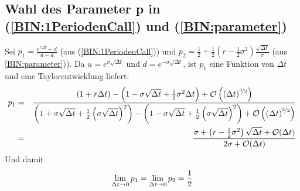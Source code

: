 \subsection{Wahl des Parameter p in (\ref{BIN:1PeriodenCall}) und (\ref{BIN:parameter})}
\label{Anhang:pundp'}
Sei $p_1 = \frac{e^{r\Delta t} - d}{u-d}$ (aus (\ref{BIN:1PeriodenCall})) und $p_2 = \frac{1}{2} + \frac{1}{2}\left(r-\frac{1}{2}\sigma^2\right)\frac{\sqrt{\Delta t}}{\sigma}$ (aus \ref{BIN:parameter})).
Da $u = e^{\sigma\sqrt{\Delta t}}$ und $d = e^{-\sigma\sqrt{\Delta t}}$, ist $p_1$ eine Funktion von $\Delta t$ und eine Taylorentwicklung liefert:
\begin{eqnarray*}
p_1 & = & \frac{\left(1+r\Delta t\right) - \left(1 - \sigma\sqrt{\Delta t} + \frac{1}{2}\sigma^2\Delta t\right) +  \mathcal{O}\left(\left(\Delta t\right)^{\nicefrac{3}{2}}\right)}{\left(1 + \sigma\sqrt{\Delta t} + \frac{1}{2}\left(\sigma\sqrt{\Delta t}\right)^2\right)- \left(1 - \sigma\sqrt{\Delta t} + \frac{1}{2}\left(\sigma\sqrt{\Delta t}\right)^2\right) + \mathcal{O}\left(\left(\Delta t\right)^{\nicefrac{3}{2}}\right)} \\
  & = & \frac{\sigma + \left(r-\frac{1}{2}\sigma^2\right)\sqrt{\Delta t} +  \mathcal{O}(\Delta t)}{2\sigma + \mathcal{O}(\Delta t)} \\
\end{eqnarray*}
Und damit
\begin{equation*}
\lim_{\Delta t \to 0} p_1 =  \lim_{\Delta t \to 0} p_2 = \frac{1}{2} \\
\end{equation*}

